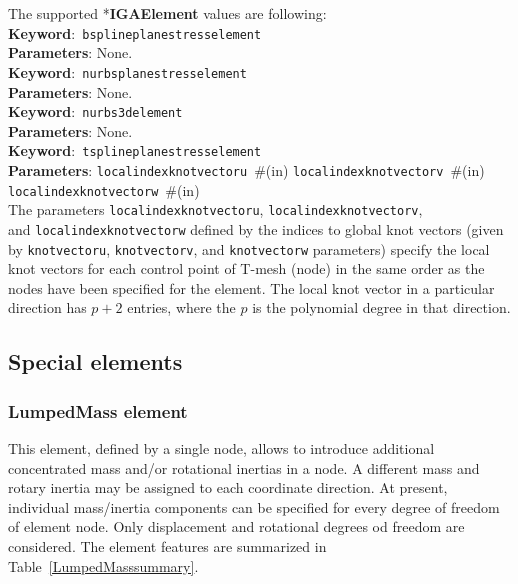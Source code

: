 \documentclass[a4paper]{article}
\newcommand{\descitem}[1]{{\noindent \textbf{#1}}:}
\newcommand{\elemkeyword}[1]{\descitem{Keyword}~\param{#1}} %
\newcommand{\param}[1]{\texttt{#1}} %
\newcommand{\field}[2]{\param{#1}~\#{\tiny(#2)}} %
\newcommand{\entKeyword}[1]{*\textbf{#1}} %
\begin{document}
The supported \entKeyword{IGAElement} values are following:\\
\elemkeyword{bsplineplanestresselement}\\
\descitem{Parameters} None.\\
\elemkeyword{nurbsplanestresselement}\\
\descitem{Parameters} None.\\
\elemkeyword{nurbs3delement}\\
\descitem{Parameters} None.\\
\elemkeyword{tsplineplanestresselement}\\
\descitem{Parameters} \field{localindexknotvectoru}{in} \field{localindexknotvectorv}{in} \field{localindexknotvectorw}{in}\\
The parameters \param{localindexknotvectoru}, \param{localindexknotvectorv},\\ and \param{localindexknotvectorw} defined by the indices to global knot vectors (given by \param{knotvectoru}, \param{knotvectorv}, and \param{knotvectorw} parameters) specify the local knot vectors for each control point of T-mesh (node) in the same order as the nodes have been specified for the element. The local knot vector in a particular direction has $p+2$ entries, where the $p$ is the polynomial degree in that direction.


\clearpage
\subsection{Special elements}
\subsubsection{LumpedMass element}
This element, defined by a single node, allows to introduce additional concentrated mass and/or rotational inertias in a node.
A different mass and rotary inertia may be assigned to each coordinate direction. At present, individual mass/inertia components can be specified for  every degree of freedom of element node. Only displacement and rotational degrees od freedom are considered.  The element features are summarized in Table~\ref{LumpedMasssummary}.
\end{document}
